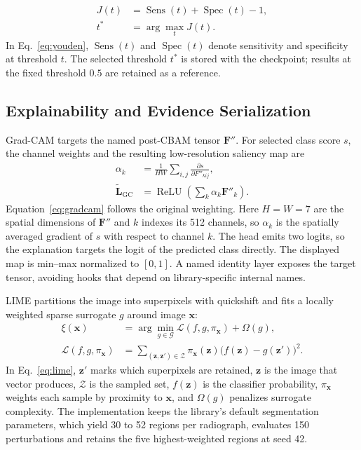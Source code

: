 \documentclass[conference]{IEEEtran}
\begin{document}
\begin{align}
J(t)&=\operatorname{Sens}(t)+\operatorname{Spec}(t)-1,
\nonumber\\
t^*&=\arg\max_t J(t).
\label{eq:youden}
\end{align}
In Eq.~\ref{eq:youden}, $\operatorname{Sens}(t)$ and $\operatorname{Spec}(t)$ denote sensitivity and specificity at threshold $t$. The selected threshold $t^*$ is stored with the checkpoint; results at the fixed threshold $0.5$ are retained as a reference.

\subsection{Explainability and Evidence Serialization}
Grad-CAM \cite{selvaraju2017gradcam} targets the named post-CBAM tensor
$\mathbf{F}''$. For selected class score $s$, the channel weights and the
resulting low-resolution saliency map are
\begin{align}
\alpha_k&=\frac{1}{HW}\sum_{i,j}\frac{\partial s}{\partial F''_{kij}}, \nonumber\\
\widetilde{\mathbf{L}}_{\mathrm{GC}}&=\operatorname{ReLU}
\left(\sum_k\alpha_k\mathbf{F}''_k\right).
\label{eq:gradcam}
\end{align}
Equation~\ref{eq:gradcam} follows the original weighting. Here $H=W=7$ are the spatial dimensions of $\mathbf{F}''$ and $k$ indexes its
512 channels, so $\alpha_k$ is the spatially averaged gradient of $s$ with
respect to channel $k$. The head emits two logits, so the explanation targets
the logit of the predicted class directly. The displayed map is min--max
normalized to $[0,1]$. A named identity layer exposes the target tensor,
avoiding hooks that depend on library-specific internal names.

LIME \cite{ribeiro2016lime} partitions the image into superpixels with
quickshift \cite{vedaldi2008quickshift} and fits a locally weighted sparse
surrogate $g$ around image $\mathbf{x}$:
\begin{align}
\xi(\mathbf{x})&=\arg\min_{g\in\mathcal{G}}
\mathcal{L}(f,g,\pi_{\mathbf{x}})+\Omega(g), \nonumber\\
\mathcal{L}(f,g,\pi_{\mathbf{x}})
&=\sum_{(\mathbf{z},\mathbf{z}')\in\mathcal{Z}}
\pi_{\mathbf{x}}(\mathbf{z})
\big(f(\mathbf{z})-g(\mathbf{z}')\big)^2.
\label{eq:lime}
\end{align}
In Eq.~\ref{eq:lime}, $\mathbf{z}'$ marks which superpixels are retained,
$\mathbf{z}$ is the image that vector produces, $\mathcal{Z}$ is the sampled
set, $f(\mathbf{z})$ is the classifier probability, $\pi_{\mathbf{x}}$ weights
each sample by proximity to $\mathbf{x}$, and $\Omega(g)$ penalizes surrogate
complexity. The implementation keeps the library's default segmentation
parameters, which yield 30 to 52 regions per radiograph, evaluates 150
perturbations and retains the five highest-weighted regions at seed 42.
\end{document}
